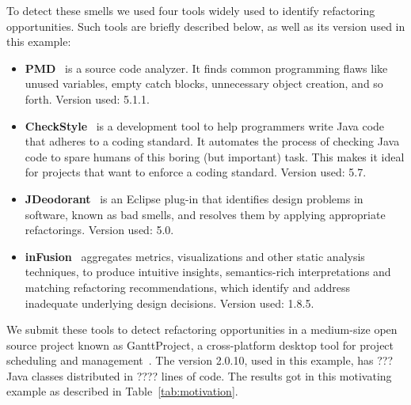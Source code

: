 \documentclass[conference]{IEEEtran}
\begin{document}
To detect these smells we used four tools widely used to identify refactoring opportunities. Such tools are briefly described below, as well as its version used in this example:

\begin{itemize}
 \item \textbf{PMD}~\cite{PMD} is a source code analyzer. It finds common programming flaws like unused variables, empty catch blocks, unnecessary object creation, and so forth. Version used: 5.1.1.
 \item \textbf{CheckStyle}~\cite{Checkstyle} is a development tool to help programmers write Java code that adheres to a coding standard. It automates the process of checking Java code to spare humans of this boring (but important) task. This makes it ideal for projects that want to enforce a coding standard. Version used: 5.7.
 \item \textbf{JDeodorant}~\cite{JDeodorant} is an Eclipse plug-in that identifies design problems in software, known as bad smells, and resolves them by applying appropriate refactorings. Version used: 5.0.
 \item \textbf{inFusion}~\cite{inFusion} aggregates metrics, visualizations and other static analysis techniques, to produce intuitive insights, semantics-rich interpretations and matching refactoring recommendations, which identify and address inadequate underlying design decisions. Version used: 1.8.5.
\end{itemize}

We submit these tools to detect refactoring opportunities in a medium-size open source project known as GanttProject, a cross-platform desktop tool for project scheduling and management~\cite{GanttProject}. The version 2.0.10, used in this example, has ??? Java classes distributed in ???? lines of code. The results got in this motivating example as described in Table~\ref{tab:motivation}.
\end{document}
